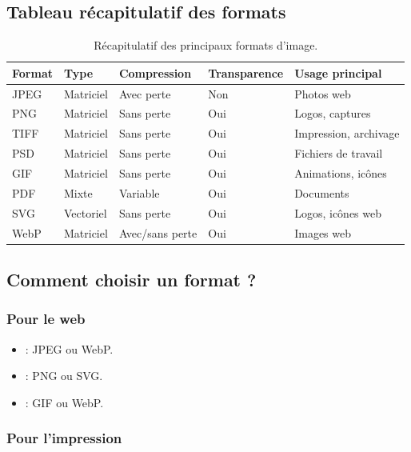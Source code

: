 \subsection{Tableau récapitulatif des formats}

\begin{table}[h!]
\centering
\begin{tabular}{@{}p{2cm}p{3cm}p{2cm}p{2cm}p{4cm}@{}}
\toprule
\textbf{Format} & \textbf{Type} & \textbf{Compression} & \textbf{Transparence} & \textbf{Usage principal} \\
\midrule
JPEG & Matriciel & Avec perte & Non & Photos web \\
PNG & Matriciel & Sans perte & Oui & Logos, captures \\
TIFF & Matriciel & Sans perte & Oui & Impression, archivage \\
PSD & Matriciel & Sans perte & Oui & Fichiers de travail \\
GIF & Matriciel & Sans perte & Oui & Animations, icônes \\
PDF & Mixte & Variable & Oui & Documents \\
SVG & Vectoriel & Sans perte & Oui & Logos, icônes web \\
WebP & Matriciel & Avec/sans perte & Oui & Images web \\
\bottomrule
\end{tabular}
\caption{Récapitulatif des principaux formats d'image.}
\end{table}

\subsection{Comment choisir un format ?}

\subsubsection{Pour le web}

\begin{itemize}
    \item {} : JPEG ou WebP.
    \item {} : PNG ou SVG.
    \item {} : GIF ou WebP.
\end{itemize}

\subsubsection{Pour l'impression}


